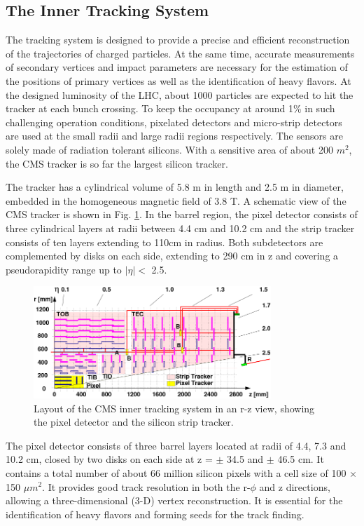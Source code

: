 \documentclass[thesis.tex]{subfiles}
\begin{document}
\subsection{The Inner Tracking System}
The tracking system is designed to provide a precise and efficient reconstruction of the trajectories of charged particles. 
At the same time, accurate measurements of secondary vertices and impact parameters are necessary for the estimation of the positions of primary vertices as well as the identification of heavy flavors. 
At the designed luminosity of the LHC, about 1000 particles are expected to hit the tracker at each bunch crossing. 
To keep the occupancy at around 1\% in such challenging operation conditions, pixelated detectors and micro-strip detectors are used at the small radii and large radii regions respectively. 
The sensors are solely made of radiation tolerant silicons. With a sensitive area of about 200 $m^2$, the CMS tracker is so far the largest silicon tracker.  

The tracker has a cylindrical volume of 5.8 m in length and 2.5 m in diameter, embedded in the homogeneous magnetic field of 3.8 T. 
A schematic view of the CMS tracker is shown in Fig. \ref{fig:tracker}. 
In the barrel region, the pixel detector consists of three cylindrical layers at radii between 4.4 cm and 10.2 cm and the strip tracker consists of ten layers extending to 110cm in radius. 
Both subdetectors are complemented by disks on each side, extending to 290 cm in z and covering a pseudorapidity range up to $|\eta| <$ 2.5. 

\begin{figure}[h]
	\centering
	\includegraphics[width=0.8\textwidth]{plot/tracker.png}
	\caption{Layout of the CMS inner tracking system in an r-z view, showing the pixel detector and the silicon strip tracker.}
	\label{fig:tracker}
\end{figure}


The pixel detector consists of three barrel layers located at radii of 4.4, 7.3 and 10.2 cm, closed by two disks on each side at z = $\pm$ 34.5 and $\pm$ 46.5 cm. 
It contains a total number of about 66 million silicon pixels with a cell size of 100 $\times$150 $\mu m^2$. 
It provides good track resolution in both the r-$\phi$ and z directions, allowing a three-dimensional (3-D) vertex reconstruction. 
It is essential for the identification of heavy flavors and forming seeds for the track finding.
\end{document}
